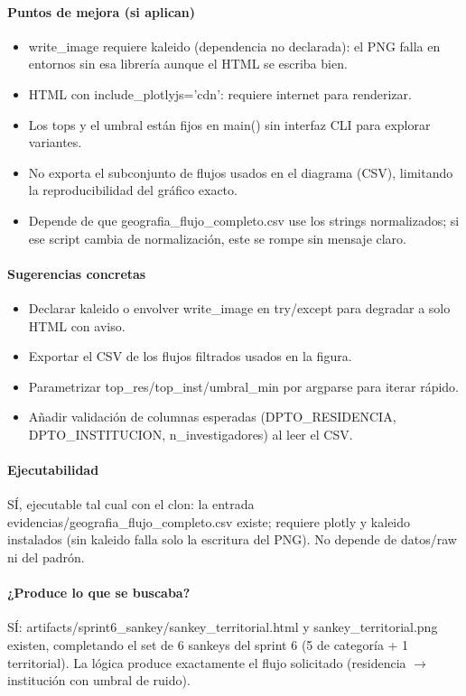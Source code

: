 \paragraph{Puntos de mejora (si aplican)}
\begin{itemize}
  \item write\_image requiere kaleido (dependencia no declarada): el PNG falla en entornos sin esa librería aunque el HTML se escriba bien.
  \item HTML con include\_plotlyjs='cdn': requiere internet para renderizar.
  \item Los tops y el umbral están fijos en main() sin interfaz CLI para explorar variantes.
  \item No exporta el subconjunto de flujos usados en el diagrama (CSV), limitando la reproducibilidad del gráfico exacto.
  \item Depende de que geografia\_flujo\_completo.csv use los strings normalizados; si ese script cambia de normalización, este se rompe sin mensaje claro.
\end{itemize}

\paragraph{Sugerencias concretas}
\begin{itemize}
  \item Declarar kaleido o envolver write\_image en try/except para degradar a solo HTML con aviso.
  \item Exportar el CSV de los flujos filtrados usados en la figura.
  \item Parametrizar top\_res/top\_inst/umbral\_min por argparse para iterar rápido.
  \item Añadir validación de columnas esperadas (DPTO\_RESIDENCIA, DPTO\_INSTITUCION, n\_investigadores) al leer el CSV.
\end{itemize}

\paragraph{Ejecutabilidad}
SÍ, ejecutable tal cual con el clon: la entrada evidencias/geografia\_flujo\_completo.csv existe; requiere plotly y kaleido instalados (sin kaleido falla solo la escritura del PNG). No depende de datos/raw ni del padrón.

\paragraph{¿Produce lo que se buscaba?}
SÍ: artifacts/sprint6\_sankey/sankey\_territorial.html y sankey\_territorial.png existen, completando el set de 6 sankeys del sprint 6 (5 de categoría + 1 territorial). La lógica produce exactamente el flujo solicitado (residencia $\rightarrow$ institución con umbral de ruido).

